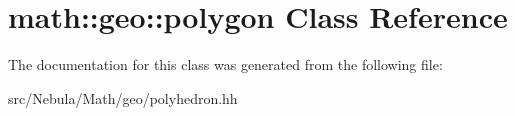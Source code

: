 \hypertarget{classmath_1_1geo_1_1polygon}{\section{math\-:\-:geo\-:\-:polygon \-Class \-Reference}
\label{classmath_1_1geo_1_1polygon}
}


\-The documentation for this class was generated from the following file\-:\begin{DoxyCompactItemize}
\item 
src/\-Nebula/\-Math/geo/polyhedron.\-hh\end{DoxyCompactItemize}
